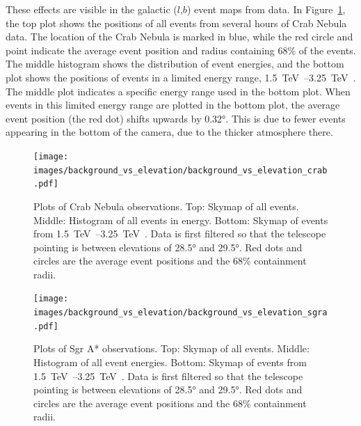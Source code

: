 These effects are visible in the galactic ($l$,$b$) event maps from data.
In Figure~\ref{fig:bkgvsel_crab}, the top plot shows the positions of all events from several hours of Crab Nebula data.
The location of the Crab Nebula is marked in blue, while the red circle and point indicate the average event position and radius containing 68\% of the events.
The middle histogram shows the distribution of event energies, and the bottom plot shows the positions of events in a limited energy range, \SIrange{1.5}{3.25}{\TeV{}}.
The middle plot indicates a specific energy range used in the bottom plot.
When events in this limited energy range are plotted in the bottom plot, the average event position (the red dot) shifts upwards by \ang{0.32}.
This is due to fewer events appearing in the bottom of the camera, due to the thicker atmosphere there.
    
% 
%
\begin{figure}[p]
  \centering
  \texttt{[image: images/background\_vs\_elevation/background\_vs\_elevation\_crab.pdf]}
  \caption[Background Vs Elevation Crab Nebula]
  {\small 
    Plots of Crab Nebula observations.
    Top: Skymap of all events.
    Middle: Histogram of all events in energy.
    Bottom: Skymap of events from \SIrange{1.5}{3.25}{\TeV{}}.  
    Data is first filtered so that the telescope pointing is between elevations of \ang{28.5} and \ang{29.5}.
    Red dots and circles are the average event positions and the 68\% containment radii.
  }
  \label{fig:bkgvsel_crab}
\end{figure}
    
\begin{figure}[p]
  \centering
  \texttt{[image: images/background\_vs\_elevation/background\_vs\_elevation\_sgra.pdf]}
  \caption[Background Vs Elevation Sgr A*]
  {\small 
    Plots of Sgr A* observations.
    Top: Skymap of all events.
    Middle: Histogram of all event energies.
    Bottom: Skymap of events from \SIrange{1.5}{3.25}{\TeV{}}.  
    Data is first filtered so that the telescope pointing is between elevations of \ang{28.5} and \ang{29.5}.
    Red dots and circles are the average event positions and the 68\% containment radii.
  }
  \label{fig:bkgvsel_sgra}
\end{figure}

